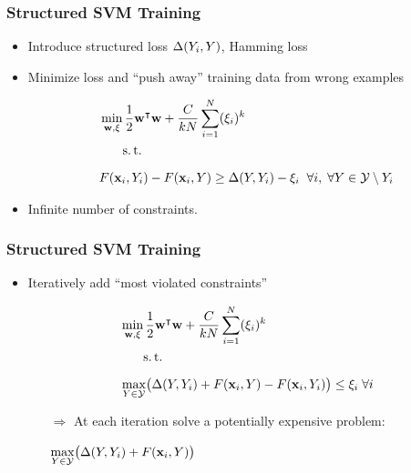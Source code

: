 \begin{frame}
    \frametitle{Structured SVM Training}
    \begin{itemize}
          \item Introduce structured loss $\Delta(Y_i, Y)$, \eg Hamming loss
          \item Minimize loss and ``push away'' training data from wrong examples
          \item[]
        \begin{align}
            &\min_{\VEC{w}, \xi} \frac{1}{2}\dualvec{w}\VEC{w} + \frac{C}{kN} \sum_{i=1}^N(\xi_i)^k
            \\ \nonumber
            &\phantom{\min_{\VEC{w}, \xi}} \st \\ \nonumber
            &F(\VEC{x}_i, Y_i) - F(\VEC{x}_i, Y) \ge \Delta(Y, Y_i) - \xi_i \; \; \forall i, \; \forall Y \in \mathcal{Y}\setminus Y_i 
        \end{align}
          \item Infinite number of constraints.
    \end{itemize}

\end{frame}

\begin{frame}
    \frametitle{Structured SVM Training}
    \begin{itemize}
          \item Iteratively add ``most violated constraints''
          \item[]
        \begin{align}
            &\min_{\VEC{w}, \xi} \frac{1}{2}\dualvec{w}\VEC{w} + \frac{C}{kN} \sum_{i=1}^N(\xi_i)^k
            \\ \nonumber
            &\phantom{\min_{\VEC{w}, \xi}} \st \\ \nonumber
            &\max_{Y\in\mathcal{Y}} \bigl(\Delta(Y, Y_i) + F( \VEC{x}_i, Y) - F(\VEC{x}_i, Y_i) \bigr) \le \xi_i
            \; \forall i 
        \end{align}
        \begin{itemize}
              \item[$\Rightarrow$] At each iteration solve a potentially expensive problem:
              \item[] $\displaystyle \max_{Y\in\mathcal{Y}} \bigl(\Delta(Y, Y_i) + F( \textbf{x}_i, Y) \bigr)$
        \end{itemize}
    \end{itemize}
    
\end{frame}

